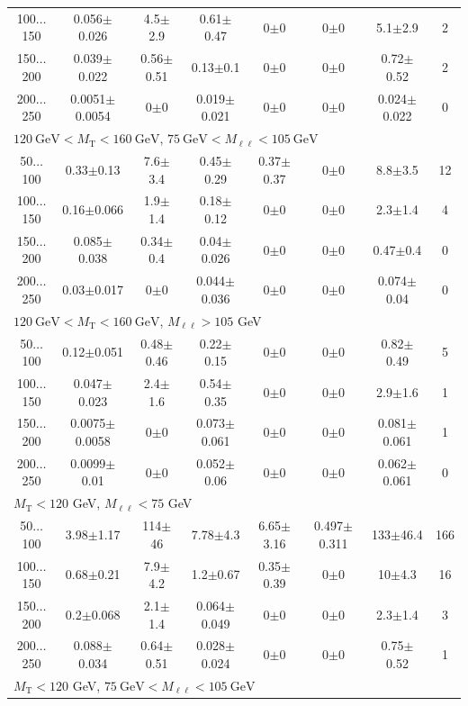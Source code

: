 \begin{table}
\begin{center}
\begin{tabular}{| c | c c c c c c c | }
100$\dots$150&0.056$\pm$0.026&4.5$\pm$2.9&0.61$\pm$0.47&0$\pm$0&0$\pm$0&5.1$\pm$2.9&2\\
150$\dots$200&0.039$\pm$0.022&0.56$\pm$0.51&0.13$\pm$0.1&0$\pm$0&0$\pm$0&0.72$\pm$0.52&2\\
200$\dots$250&0.0051$\pm$0.0054&0$\pm$0&0.019$\pm$0.021&0$\pm$0&0$\pm$0&0.024$\pm$0.022&0\\
\hline\hline
\multicolumn{8}{l}{$120~\mathrm{GeV} < M_{\text{T}} < 160~\mathrm{GeV}$, $75~\mathrm{GeV} < M_{\ell\ell} < 105~\mathrm{GeV}$}\\\hline\hline
50$\dots$100&0.33$\pm$0.13&7.6$\pm$3.4&0.45$\pm$0.29&0.37$\pm$0.37&0$\pm$0&8.8$\pm$3.5&12\\
100$\dots$150&0.16$\pm$0.066&1.9$\pm$1.4&0.18$\pm$0.12&0$\pm$0&0$\pm$0&2.3$\pm$1.4&4\\
150$\dots$200&0.085$\pm$0.038&0.34$\pm$0.4&0.04$\pm$0.026&0$\pm$0&0$\pm$0&0.47$\pm$0.4&0\\
200$\dots$250&0.03$\pm$0.017&0$\pm$0&0.044$\pm$0.036&0$\pm$0&0$\pm$0&0.074$\pm$0.04&0\\
\hline\hline
\multicolumn{8}{l}{$120~\mathrm{GeV} < M_{\text{T}} < 160~\mathrm{GeV}$, $M_{\ell\ell} > 105$ GeV}\\\hline\hline
50$\dots$100&0.12$\pm$0.051&0.48$\pm$0.46&0.22$\pm$0.15&0$\pm$0&0$\pm$0&0.82$\pm$0.49&5\\
100$\dots$150&0.047$\pm$0.023&2.4$\pm$1.6&0.54$\pm$0.35&0$\pm$0&0$\pm$0&2.9$\pm$1.6&1\\
150$\dots$200&0.0075$\pm$0.0058&0$\pm$0&0.073$\pm$0.061&0$\pm$0&0$\pm$0&0.081$\pm$0.061&1\\
200$\dots$250&0.0099$\pm$0.01&0$\pm$0&0.052$\pm$0.06&0$\pm$0&0$\pm$0&0.062$\pm$0.061&0\\
\hline\hline
\multicolumn{8}{l}{$M_{\text{T}} < 120$ GeV, $M_{\ell\ell} < 75$ GeV}\\\hline\hline
50$\dots$100&3.98$\pm$1.17&114$\pm$46&7.78$\pm$4.3&6.65$\pm$3.16&0.497$\pm$0.311&133$\pm$46.4&166\\
100$\dots$150&0.68$\pm$0.21&7.9$\pm$4.2&1.2$\pm$0.67&0.35$\pm$0.39&0$\pm$0&10$\pm$4.3&16\\
150$\dots$200&0.2$\pm$0.068&2.1$\pm$1.4&0.064$\pm$0.049&0$\pm$0&0$\pm$0&2.3$\pm$1.4&3\\
200$\dots$250&0.088$\pm$0.034&0.64$\pm$0.51&0.028$\pm$0.024&0$\pm$0&0$\pm$0&0.75$\pm$0.52&1\\
\hline\hline
\multicolumn{8}{l}{$M_{\text{T}} < 120$ GeV, $75~\mathrm{GeV} < M_{\ell\ell} < 105~\mathrm{GeV}$}\\\hline\hline

\end{tabular}
\end{center}
\end{table}
